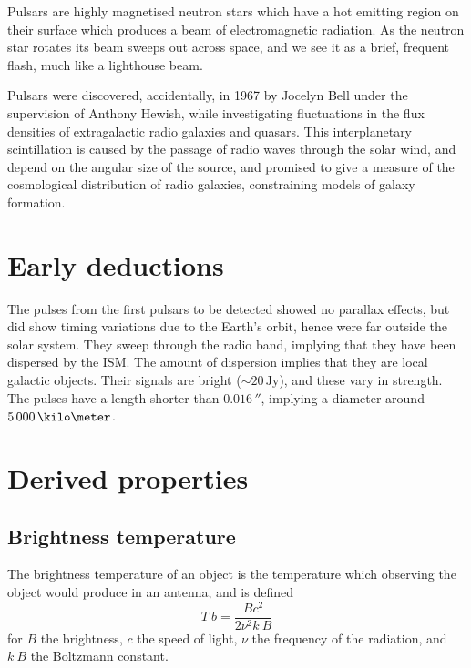 Pulsars are highly magnetised neutron stars which have a hot emitting
region on their surface which produces a beam of electromagnetic
radiation. As the neutron star rotates its beam sweeps out across
space, and we see it as a brief, frequent flash, much like a
lighthouse beam.

Pulsars were discovered, accidentally, in 1967 by Jocelyn Bell under
the supervision of Anthony Hewish, while investigating fluctuations in
the flux densities of extragalactic radio galaxies and quasars. This
interplanetary scintillation is caused by the passage of radio waves
through the solar wind, and depend on the angular size of the source,
and promised to give a measure of the cosmological distribution of
radio galaxies, constraining models of galaxy formation.

\section{Early deductions}
\label{sec:early-deductions}

The pulses from the first pulsars to be detected showed no parallax
effects, but did show timing variations due to the Earth's orbit,
hence were far outside the solar system. They sweep through the radio
band, implying that they have been dispersed by the ISM. The amount of
dispersion implies that they are local galactic objects. Their signals
are bright ($\sim 20\,\text{Jy}$), and these vary in strength. The
pulses have a length shorter than $0.016\,\second$, implying a
diameter around $5\,000\,\kilo\meter$.

\section{Derived properties}
\label{sec:derived-properties}

\subsection{Brightness temperature}
\label{sec:brightn-temp}

The brightness temperature of an object is the temperature which
observing the object would produce in an antenna, and is defined
\begin{equation}
  \label{eq:89}
  T~b = \frac{B c^2}{2 \nu^2 k~B}
\end{equation}
for $B$ the brightness, $c$ the speed of light, $\nu$ the frequency of
the radiation, and $k~B$ the Boltzmann constant.

